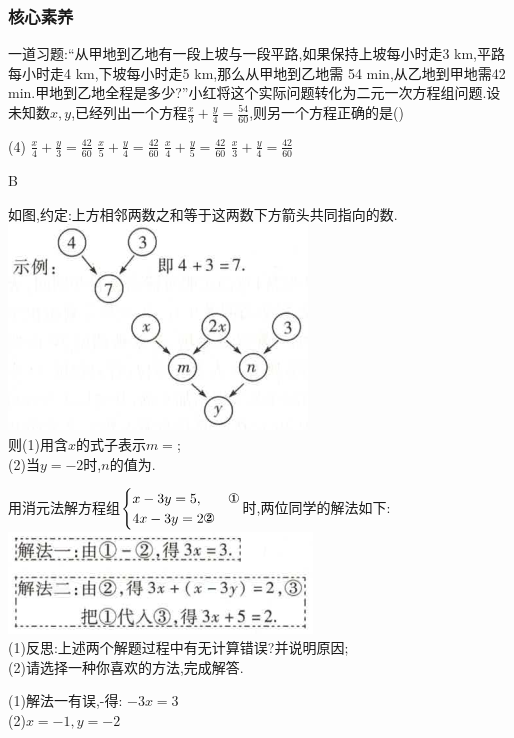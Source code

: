 \documentclass[cn,blue,12pt]{elegantbook}
\renewcommand \tkt[1]{{\CJKunderline[hidden=true, skip=true, thickness=1pt]{#1}}}
\begin{document}
\subsubsection{核心素养}%
\begin{zhenti}[resume]
\item 一道习题:“从甲地到乙地有一段上坡与一段平路,如果保持上坡每小时走3 km,平路每小时走4 km,下坡每小时走5 km,那么从甲地到乙地需 54 min,从乙地到甲地需42 min.甲地到乙地全程是多少?”小红将这个实际问题转化为二元一次方程组问题.设未知数\(x,y\),已经列出一个方程\(\frac{x}{3}+\frac{y}{4}=\frac{54}{60}\),则另一个方程正确的是(\qquad)\\
\begin{tasks}(4)
\task \(\frac{x}{4}+\frac{y}{3}=\frac{42}{60}\)
\task \(\frac{x}{5}+\frac{y}{4}=\frac{42}{60}\)
\task \(\frac{x}{4}+\frac{y}{5}=\frac{42}{60}\)
\task \(\frac{x}{3}+\frac{y}{4}=\frac{42}{60}\)
\end{tasks}
\begin{solution}
    B
\end{solution}
\item 如图,约定:上方相邻两数之和等于这两数下方箭头共同指向的数.\\
\includegraphics[width=0.5\linewidth]{pic/20200531006.png}\\
则(1)用含\(x\)的式子表示\(m=\)\tkt{\(3x\)};\\
(2)当\(y=-2\)时,\(n\)的值为\tkt{\(1\)}.
\item 用消元法解方程组\(\begin{cases} x-3y=5, & \text{\ding{172}}\\ 4x-3y=2 \text{\ding{173}}\end{cases}\)时,两位同学的解法如下:\\
\includegraphics[width=0.4\linewidth]{pic/20200531007.png}\\
(1)反思:上述两个解题过程中有无计算错误?并说明原因;\\
(2)请选择一种你喜欢的方法,完成解答.
\begin{solution}
    (1)解法一有误,-得: \(-3x=3\)\\
    (2)\(x=-1, y=-2\)
\end{solution}
\end{zhenti}
\end{document}
